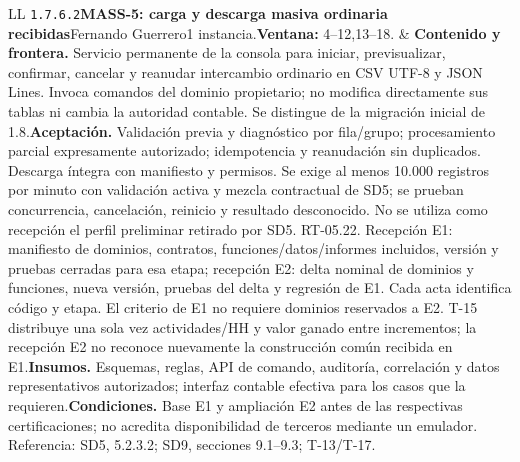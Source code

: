 \begin{longtable}{L{\tabcolsep\relax}L{\tabcolsep\relax}}
\texttt{1.\allowbreak{}7.\allowbreak{}6.\allowbreak{}2}\newline{}\textbf{MASS-5: carga y descarga masiva ordinaria recibidas}\newline{}Fernando Guerrero\newline{}1 instancia.\newline{}\textbf{Ventana:} 4--12,13--18. & \textbf{Contenido y frontera.} Servicio permanente de la consola para iniciar, previsualizar, confirmar, cancelar y reanudar intercambio ordinario en CSV UTF-8 y JSON Lines. Invoca comandos del dominio propietario; no modifica directamente sus tablas ni cambia la autoridad contable. Se distingue de la migración inicial de 1.8.\newline{}\textbf{Aceptación.} Validación previa y diagnóstico por fila/grupo; procesamiento parcial expresamente autorizado; idempotencia y reanudación sin duplicados. Descarga íntegra con manifiesto y permisos. Se exige al menos 10.000 registros por minuto con validación activa y mezcla contractual de SD5; se prueban concurrencia, cancelación, reinicio y resultado desconocido. No se utiliza como recepción el perfil preliminar retirado por SD5. RT-05.22. Recepción E1: manifiesto de dominios, contratos, funciones/datos/informes incluidos, versión y pruebas cerradas para esa etapa; recepción E2: delta nominal de dominios y funciones, nueva versión, pruebas del delta y regresión de E1. Cada acta identifica código y etapa. El criterio de E1 no requiere dominios reservados a E2. T-15 distribuye una sola vez actividades/HH y valor ganado entre incrementos; la recepción E2 no reconoce nuevamente la construcción común recibida en E1.\newline{}\textbf{Insumos.} Esquemas, reglas, API de comando, auditoría, correlación y datos representativos autorizados; interfaz contable efectiva para los casos que la requieren.\newline{}\textbf{Condiciones.} Base E1 y ampliación E2 antes de las respectivas certificaciones; no acredita disponibilidad de terceros mediante un emulador. Referencia: SD5, 5.2.3.2; SD9, secciones 9.1--9.3; T-13/T-17.\\\hline

\end{longtable}
